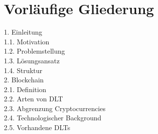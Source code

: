 \section{Vorläufige Gliederung}
\begin{small}
	1. Einleitung\\
	\noindent\hspace*{10mm}%
	1.1. Motivation\\
	\noindent\hspace*{10mm}%
	1.2. Problemstellung\\
	\noindent\hspace*{10mm}%
	1.3. Lösungsansatz\\
	\noindent\hspace*{10mm}%
	1.4. Struktur\\
	2. Blockchain\\
	\noindent\hspace*{10mm}%
	2.1. Definition\\
	\noindent\hspace*{10mm}%
	2.2. Arten von DLT\\
	\noindent\hspace*{10mm}%
	2.3. Abgrenzung Cryptocurrencies\\
	\noindent\hspace*{10mm}%
	2.4. Technologischer Background\\
	\noindent\hspace*{10mm}%
	2.5. Vorhandene DLTs\\

\end{small}
